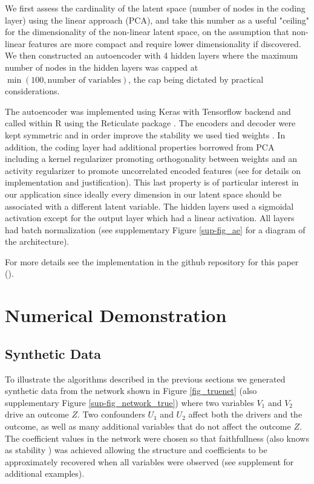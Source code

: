 \documentclass[letterpaper]{article}
\begin{document}
We first assess the cardinality of the latent space (number of nodes in the coding layer) using the linear approach (PCA), and take this number as a useful "ceiling" for the dimensionality of the non-linear latent space, on the assumption that non-linear features are more compact and require lower dimensionality if discovered.  We then constructed an autoencoder with 4 hidden layers where the maximum number of nodes in the hidden layers was capped at $\min (100, \textrm{number of variables})$, the cap being dictated by practical considerations.

The autoencoder was implemented using Keras with Tensorflow backend and called within R using the Reticulate package \cite{reticulate_2020}. The encoders and decoder were kept symmetric and in order improve the stability we used tied weights \cite{pca_ae}. In addition, the coding layer had additional properties borrowed from PCA including a kernel regularizer promoting orthogonality between weights and an activity regularizer to promote uncorrelated encoded features (see \cite{ranjan_build_2019} for details on implementation and justification). This last property is of particular interest in our application since ideally every dimension in our latent space should be associated with a different latent variable. The hidden layers used a sigmoidal activation except for the output layer which had a linear activation. All layers had batch normalization \cite{ioffe2015batch} (see supplementary Figure \ref{sup-fig_ae} for a diagram of the architecture).

For more details see the implementation in the github repository for this paper (\cite{latent_2020}).

\section{Numerical Demonstration}
\subsection{Synthetic Data}
To illustrate  the algorithms described in the previous sections we
generated synthetic data from the network shown in Figure
\ref{fig_truenet} (also supplementary Figure \ref{sup-fig_network_true}) where two variables $V_1$ and $V_2$ drive an outcome
$Z$. Two confounders $U_1$ and $U_2$ affect both the drivers and the
outcome, as well as many additional variables that do not affect the
outcome $Z$.
The coefficient values in the network were chosen so that faithfullness (also knows as stability \cite{pearl_causality:_2000}) was achieved allowing the structure and coefficients to be  approximately recovered when all variables were observed (see supplement for additional examples).
\end{document}
